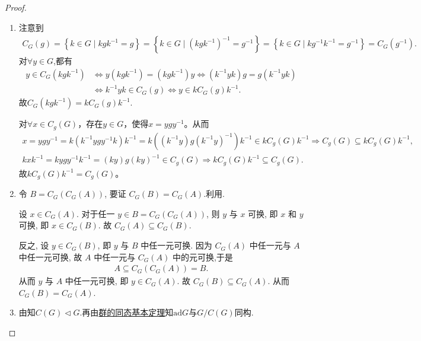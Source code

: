 \documentclass[../../main.tex]{subfiles}%
\begin{document}
\begin{proof}
\begin{enumerate}[(1)]
\item 注意到
\begin{align*}
C_G\left( g \right) =\left\{ k\in G\mid kgk^{-1}=g \right\} =\left\{ k\in G\mid \left( kgk^{-1} \right) ^{-1}=g^{-1} \right\} =\left\{ k\in G\mid kg^{-1}k^{-1}=g^{-1} \right\} =C_G\left( g^{-1} \right) .
\end{align*}
对$\forall y\in G$,都有
\begin{align*}
y\in C_G\left( kgk^{-1} \right) &\Longleftrightarrow y\left( kgk^{-1} \right) =\left( kgk^{-1} \right) y\Longleftrightarrow \left( k^{-1}yk \right) g=g\left( k^{-1}yk \right) 
\\
&\Longleftrightarrow k^{-1}yk\in C_G\left( g \right) \Longleftrightarrow y\in kC_G\left( g \right) k^{-1}.
\end{align*}
故$C_G(kgk^{-1})=kC_G(g)k^{-1}$.

对$\forall x\in C_g(G)$，存在$y\in G$，使得$x=ygy^{-1}$。从而
\begin{align*}
x=ygy^{-1}=k(k^{-1}ygy^{-1}k)k^{-1}=k((k^{-1}y)g(k^{-1}y)^{-1})k^{-1}\in kC_g(G)k^{-1}\Longrightarrow C_g(G)\subseteq kC_g(G)k^{-1},\\
kxk^{-1}=kygy^{-1}k^{-1}=(ky)g(ky)^{-1}\in C_g(G)\Longrightarrow kC_g(G)k^{-1}\subseteq C_g(G).
\end{align*}
故$kC_g(G)k^{-1}=C_g(G)$。

\item 令 $B = C_G(C_G(A))$, 要证 $C_G(B) = C_G(A)$.利用.

设 $x \in C_G(A)$. 对于任一 $y \in B = C_G(C_G(A))$, 则 $y$ 与 $x$ 可换, 即 $x$ 和 $y$ 可换, 即 $x \in C_G(B)$. 故 $C_G(A) \subseteq C_G(B)$.

反之, 设 $y \in C_G(B)$, 即 $y$ 与 $B$ 中任一元可换. 因为 $C_G(A)$ 中任一元与 $A$ 中任一元可换, 故 $A$ 中任一元与 $C_G(A)$ 中的元可换,于是
\begin{align*}
A \subseteq C_G(C_G(A)) = B.
\end{align*}
从而 $y$ 与 $A$ 中任一元可换, 即 $y \in C_G(A)$. 故 $C_G(B) \subseteq C_G(A)$. 从而 $C_G(B) = C_G(A)$.

\item 由知$C(G)\lhd G$.再由\hyperref[theorem:群的同态基本定理]{群的同态基本定理}知$\text{ad}G$与$G/C(G)$同构.


\end{enumerate}
\end{proof}
\end{document}
